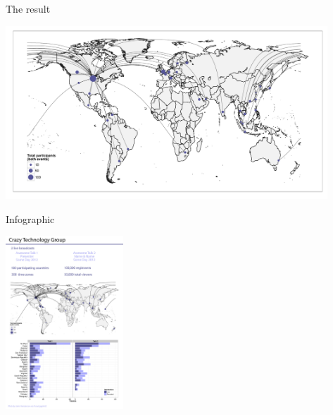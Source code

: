 \documentclass[sans,aspectratio=169,presentation,bigger,fleqn]{beamer}
\begin{document}
\begin{frame}[label=sec-20]{The result}
\normalsize


\begin{center}
\includegraphics[height=6.5cm]{./plots/great-circles.pdf}
\end{center}
\end{frame}
\begin{frame}[label=sec-21]{Infographic}
\begin{center}
\includegraphics[height=6.5cm]{./img/infographic-flattened-lo.jpg}
\end{center}
\end{frame}
\end{document}
